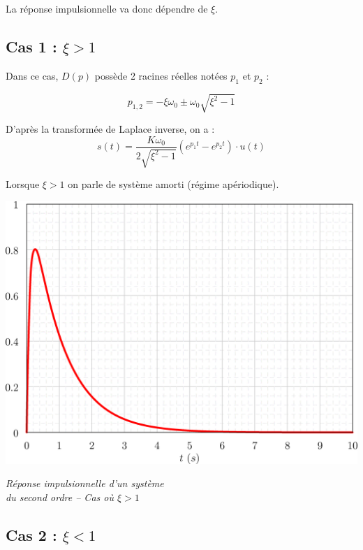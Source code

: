 \documentclass[11pt,oneside]{article}
\begin{document}
La réponse impulsionnelle va donc dépendre de $\xi$.

\subsection{Cas 1 : $\xi>1$}
\begin{minipage}[c]{.46\linewidth}
Dans ce cas, $D(p)$ possède 2 racines réelles notées $p_1$ et $p_2$ :

$$
p_{1,2} 
=-\xi\omega_0\pm\omega_0\sqrt{ \xi^2 -1}
$$


D'après la transformée de Laplace inverse, on a : 
$$
s(t)=\dfrac{K\omega_0}{2\sqrt{\xi^2-1}} \left(e^{p_1 t}-e^{p_2 t} \right)\cdot
u(t) 
$$

Lorsque $\xi>1$ on parle de système amorti (régime apériodique).
\end{minipage} \hfill
\begin{minipage}[c]{.46\linewidth}
\begin{center}
\includegraphics[width=.9\textwidth]{png/ordre2_dirac_1}

\textit{Réponse impulsionnelle d'un système \\ du second ordre -- Cas où $\xi > 1$}
\end{center}
\end{minipage}

\subsection{Cas 2 : $\xi<1$}
\end{document}
